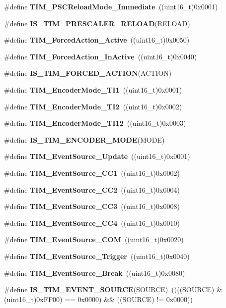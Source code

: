 \begin{DoxyCompactItemize}
\item 
\#define \textbf{ T\+I\+M\+\_\+\+P\+S\+C\+Reload\+Mode\+\_\+\+Immediate}~((uint16\+\_\+t)0x0001)
\item 
\#define \textbf{ I\+S\+\_\+\+T\+I\+M\+\_\+\+P\+R\+E\+S\+C\+A\+L\+E\+R\+\_\+\+R\+E\+L\+O\+AD}(R\+E\+L\+O\+AD)
\item 
\#define \textbf{ T\+I\+M\+\_\+\+Forced\+Action\+\_\+\+Active}~((uint16\+\_\+t)0x0050)
\item 
\#define \textbf{ T\+I\+M\+\_\+\+Forced\+Action\+\_\+\+In\+Active}~((uint16\+\_\+t)0x0040)
\item 
\#define \textbf{ I\+S\+\_\+\+T\+I\+M\+\_\+\+F\+O\+R\+C\+E\+D\+\_\+\+A\+C\+T\+I\+ON}(A\+C\+T\+I\+ON)
\item 
\#define \textbf{ T\+I\+M\+\_\+\+Encoder\+Mode\+\_\+\+T\+I1}~((uint16\+\_\+t)0x0001)
\item 
\#define \textbf{ T\+I\+M\+\_\+\+Encoder\+Mode\+\_\+\+T\+I2}~((uint16\+\_\+t)0x0002)
\item 
\#define \textbf{ T\+I\+M\+\_\+\+Encoder\+Mode\+\_\+\+T\+I12}~((uint16\+\_\+t)0x0003)
\item 
\#define \textbf{ I\+S\+\_\+\+T\+I\+M\+\_\+\+E\+N\+C\+O\+D\+E\+R\+\_\+\+M\+O\+DE}(M\+O\+DE)
\item 
\#define \textbf{ T\+I\+M\+\_\+\+Event\+Source\+\_\+\+Update}~((uint16\+\_\+t)0x0001)
\item 
\#define \textbf{ T\+I\+M\+\_\+\+Event\+Source\+\_\+\+C\+C1}~((uint16\+\_\+t)0x0002)
\item 
\#define \textbf{ T\+I\+M\+\_\+\+Event\+Source\+\_\+\+C\+C2}~((uint16\+\_\+t)0x0004)
\item 
\#define \textbf{ T\+I\+M\+\_\+\+Event\+Source\+\_\+\+C\+C3}~((uint16\+\_\+t)0x0008)
\item 
\#define \textbf{ T\+I\+M\+\_\+\+Event\+Source\+\_\+\+C\+C4}~((uint16\+\_\+t)0x0010)
\item 
\#define \textbf{ T\+I\+M\+\_\+\+Event\+Source\+\_\+\+C\+OM}~((uint16\+\_\+t)0x0020)
\item 
\#define \textbf{ T\+I\+M\+\_\+\+Event\+Source\+\_\+\+Trigger}~((uint16\+\_\+t)0x0040)
\item 
\#define \textbf{ T\+I\+M\+\_\+\+Event\+Source\+\_\+\+Break}~((uint16\+\_\+t)0x0080)
\item 
\#define \textbf{ I\+S\+\_\+\+T\+I\+M\+\_\+\+E\+V\+E\+N\+T\+\_\+\+S\+O\+U\+R\+CE}(S\+O\+U\+R\+CE)~((((S\+O\+U\+R\+CE) \& (uint16\+\_\+t)0x\+F\+F00) == 0x0000) \&\& ((\+S\+O\+U\+R\+C\+E) != 0x0000))
\item 

\end{DoxyCompactItemize}
